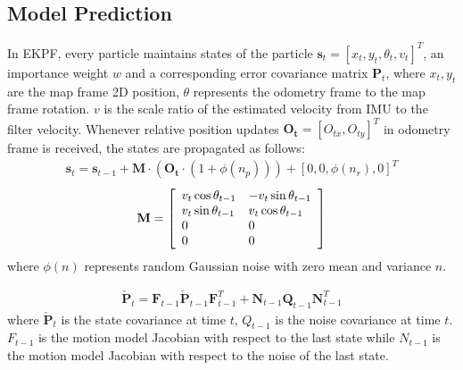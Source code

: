 \subsection{Model Prediction} 
In EKPF, every particle maintains states of the particle $\mathbf{s}_{t}=[x_t,y_t,\theta_t,v_t]^T$, an importance weight $w$ and a corresponding error covariance matrix $\mathbf{P}_{t}$, where $x_t,y_t$ are the map frame 2D position, $\theta$ represents the odometry frame to the map frame rotation. $v$ is the scale ratio of the estimated velocity from IMU to the filter velocity. Whenever relative position updates $\mathbf{O_{t}} = {[O_{tx},O_{ty}]^T}$ in odometry frame is received, the states are propagated as follows:
\begin{equation}
\begin{aligned}
\mathbf{s}_{t}=\mathbf{s}_{t-1}+\mathbf{M}\cdot(\mathbf{O_{t}} \cdot (1+\phi(n_p)))+ [0,0,\phi(n_r),0]^T 
\end{aligned}
\end{equation}
\begin{equation}
\begin{aligned}
\mathbf{M} = {\left[\begin{array}{l l l}{v_t\cos\theta_{t-1}}&{-v_t\sin\theta_{t-1}}\\ {v_t\sin\theta_{t-1}}&{v_t\cos\theta_{t-1}}\\ {0}&{0}\\ {0}&{0}\end{array}\right]}
\end{aligned}
\end{equation}
where $\phi(n)$ represents random Gaussian noise with zero mean and variance $n$.


\begin{equation}
\begin{aligned}
\check{\mathbf{P}}_{t}=\mathbf{F}_{t-1}\check{\mathbf{P}}_{t-1}\mathbf{F}_{t-1}^{T}+\mathbf{N}_{t-1}\mathbf{Q}_{t-1}\mathbf{N}_{t-1}^{T}
\end{aligned}
\end{equation}
where $\check{\mathbf{P}}_{t}$ is the state covariance at time $t$, $Q_{t-1}$ is the noise covariance at time $t$. ${F}_{t-1}$ is the motion model Jacobian with respect to the last state while ${N}_{t-1}$ is the motion model Jacobian with respect to the noise of the last state. 

